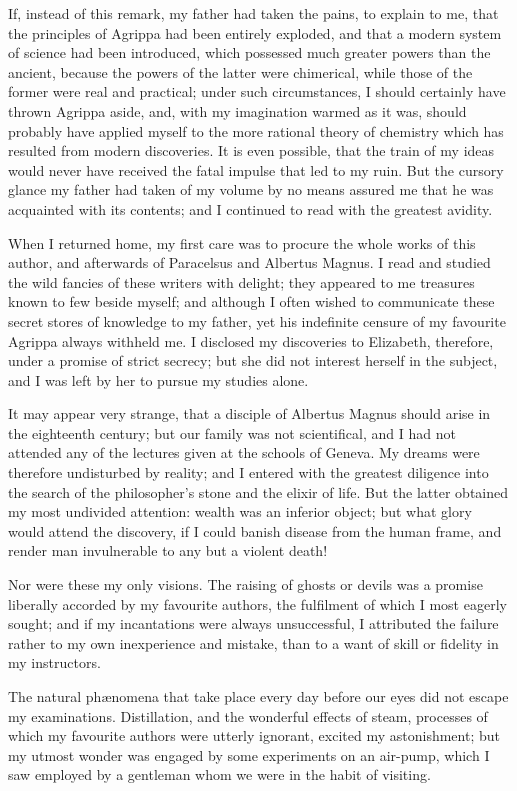 If, instead of this remark, my father
had taken the pains, to explain to me,
that the principles of Agrippa had been
entirely exploded, and that a modern
system of science had been introduced,
which possessed much greater powers
than the ancient, because the powers
of the latter were chimerical, while
those of the former were real and practical;
under such circumstances, I
should certainly have thrown Agrippa
aside, and, with my imagination warmed
as it was, should probably have applied
myself to the more rational theory of
chemistry which has resulted from
modern discoveries. It is even possible,
that the train of my ideas would
never have received the fatal impulse
that led to my ruin. But the cursory
glance my father had taken of my volume
by no means assured me that he
was acquainted with its contents; and
I continued to read with the greatest
avidity.

When I returned home, my first care
was to procure the whole works of this
author, and afterwards of Paracelsus
and Albertus Magnus. I read and
studied the wild fancies of these writers
with delight; they appeared to me treasures
known to few beside myself;
and although I often wished to communicate
these secret stores of knowledge
to my father, yet his indefinite
censure of my favourite Agrippa always
withheld me. I disclosed my discoveries
to Elizabeth, therefore, under a
promise of strict secrecy; but she did
not interest herself in the subject,
and I was left by her to pursue my
studies alone.

It may appear very strange, that a
disciple of Albertus Magnus should
arise in the eighteenth century; but
our family was not scientifical, and I
had not attended any of the lectures
given at the schools of Geneva. My
dreams were therefore undisturbed by
reality; and I entered with the greatest
diligence into the search of the philosopher's
stone and the elixir of life.
But the latter obtained my most undivided
attention: wealth was an inferior
object; but what glory would attend
the discovery, if I could banish disease
from the human frame, and render
man invulnerable to any but a violent
death!

Nor were these my only visions. The
raising of ghosts or devils was a promise
liberally accorded by my favourite
authors, the fulfilment of which I most
eagerly sought; and if my incantations
were always unsuccessful, I attributed
the failure rather to my own inexperience
and mistake, than to a want of
skill or fidelity in my instructors.

The natural phænomena that take
place every day before our eyes did not
escape my examinations. Distillation,
and the wonderful effects of steam, processes
of which my favourite authors
were utterly ignorant, excited my astonishment;
but my utmost wonder was
engaged by some experiments on an air-pump,
which I saw employed by a gentleman
whom we were in the habit of
visiting.


